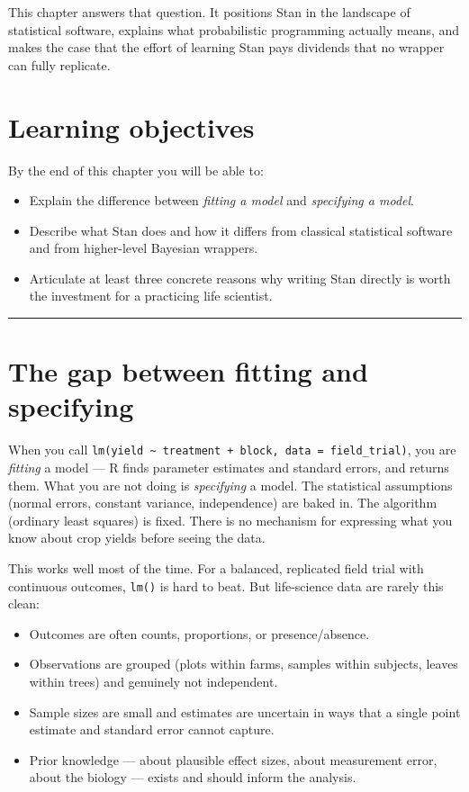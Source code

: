 \documentclass[
  11pt,
  a4paper,
  oneside,
  openany]{scrbook}
\providecommand{\tightlist}{%
  \setlength{\itemsep}{0pt}\setlength{\parskip}{0pt}}\usepackage{longtable,booktabs,array}
\begin{document}
This chapter answers that question. It positions Stan in the landscape
of statistical software, explains what probabilistic programming
actually means, and makes the case that the effort of learning Stan pays
dividends that no wrapper can fully replicate.

\section{Learning objectives}\label{learning-objectives}

By the end of this chapter you will be able to:

\begin{itemize}
\tightlist
\item
  Explain the difference between \emph{fitting a model} and
  \emph{specifying a model}.
\item
  Describe what Stan does and how it differs from classical statistical
  software and from higher-level Bayesian wrappers.
\item
  Articulate at least three concrete reasons why writing Stan directly
  is worth the investment for a practicing life scientist.
\end{itemize}

\begin{center}\rule{0.5\linewidth}{0.5pt}\end{center}

\section{The gap between fitting and
specifying}\label{the-gap-between-fitting-and-specifying}

When you call
\texttt{lm(yield\ \textasciitilde{}\ treatment\ +\ block,\ data\ =\ field\_trial)},
you are \emph{fitting} a model --- R finds parameter estimates and
standard errors, and returns them. What you are not doing is
\emph{specifying} a model. The statistical assumptions (normal errors,
constant variance, independence) are baked in. The algorithm (ordinary
least squares) is fixed. There is no mechanism for expressing what you
know about crop yields before seeing the data.

This works well most of the time. For a balanced, replicated field trial
with continuous outcomes, \texttt{lm()} is hard to beat. But
life-science data are rarely this clean:

\begin{itemize}
\tightlist
\item
  Outcomes are often counts, proportions, or presence/absence.
\item
  Observations are grouped (plots within farms, samples within subjects,
  leaves within trees) and genuinely not independent.
\item
  Sample sizes are small and estimates are uncertain in ways that a
  single point estimate and standard error cannot capture.
\item
  Prior knowledge --- about plausible effect sizes, about measurement
  error, about the biology --- exists and should inform the analysis.
\end{itemize}
\end{document}
